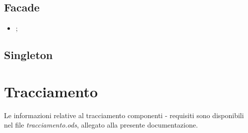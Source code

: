 \documentclass[10pt,a4paper,headinclude,footinclude,hidelinks]{scrreprt} %
\begin{document}
	\section{Facade}
	\label{sec:stage:design:pattern:facade}
	\begin{itemize}
	\item {};
	\end{itemize}

	\section{Singleton}
	\label{sec:stage:design:pattern:singleton}

	\chapter{Tracciamento}
	\label{ch:stage:design:tracciamento}
	Le informazioni relative al tracciamento componenti - requisiti sono disponibili nel file \textit{tracciamento.ods}, allegato alla presente documentazione.
\end{document}
